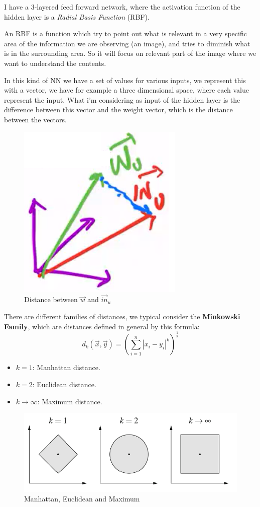 \documentclass{article}
\begin{document}
I have a 3-layered feed forward network, where the activation function of the hidden layer is a \textit{
    Radial Basis Function} (RBF).

An RBF is a function which try to point out what is relevant in a very specific area of the information
we are observing (an image), and tries to diminish what is in the surrounding area. So it will focus on
relevant part of the image where we want to understand the contents.

In this kind of NN we have a set of values for various inputs, we represent this with a vector, we have
for example a three dimensional space, where each value represent the input. What i'm considering as input
of the hidden layer is the difference between this vector and the weight vector, which is the distance
between the vectors.
\begin{figure}[H]
    \centering
    \includegraphics[scale=0.5]{images/rbf.png}
    \caption{Distance between $\vec{w}$ and $\vec{in}_{u}$}
\end{figure}
There are different families of distances, we typical consider the \textbf{Minkowski Family}, which are
distances defined in general by this formula:
$$d_k(\vec{x},\vec{y})=\left(\sum_{i=1}^n |x_i-y_i|^k\right)^{\frac{1}{k}}$$
\begin{itemize}
    \item $k=1$: Manhattan distance.
    \item $k=2$: Euclidean distance.
    \item $k\rightarrow\infty$: Maximum distance.
\end{itemize}

\begin{figure}[H]
    \centering
    \includegraphics[scale=0.5]{images/mknowski.png}
    \caption{Manhattan, Euclidean and Maximum}
\end{figure}
\end{document}
